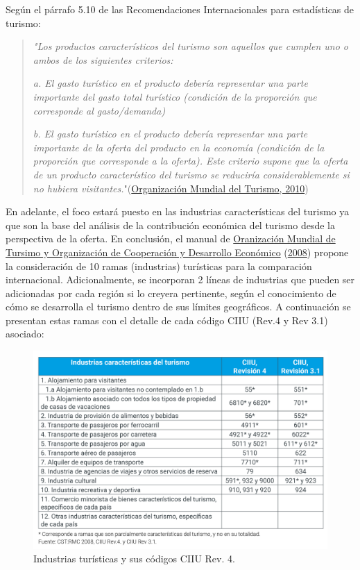 \documentclass[
  openany]{book}
\begin{document}
Según el párrafo 5.10 de las Recomendaciones Internacionales para estadísticas de turismo:

\begin{quote}
\emph{"Los productos característicos del turismo son aquellos que cumplen uno o ambos de los siguientes criterios:}

\emph{a. El gasto turístico en el producto debería representar una parte importante del gasto total turístico (condición de la proporción que corresponde al gasto/demanda)}

\emph{b. El gasto turístico en el producto debería representar una parte importante de la oferta del producto en la economía (condición de la proporción que corresponde a la oferta). Este criterio supone que la oferta de un producto característico del turismo se reduciría considerablemente si no hubiera visitantes.}"(\protect\hyperlink{ref-riet2008}{Organización Mundial del Turismo, 2010})
\end{quote}

En adelante, el foco estará puesto en las industrias características del turismo ya que son la base del análisis de la contribución económica del turismo desde la perspectiva de la oferta. En conclusión, el manual de \protect\hyperlink{ref-cstrmc2008}{Oranización Mundial de Tursimo y Organización de Cooperación y Desarrollo Económico} (\protect\hyperlink{ref-cstrmc2008}{2008}) propone la consideración de 10 ramas (industrias) turísticas para la comparación internacional. Adicionalmente, se incorporan 2 líneas de industrias que pueden ser adicionadas por cada región si lo creyera pertinente, según el conocimiento de cómo se desarrolla el turismo dentro de sus límites geográficos. A continuación se presentan estas ramas con el detalle de cada código CIIU (Rev.4 y Rev 3.1) asociado:

\begin{figure}

{\centering \includegraphics[width=1\linewidth]{imagenes/figura1.2} 

}

\caption{Industrias turísticas y sus códigos CIIU Rev. 4.}\label{fig:ciiu2}
\end{figure}
\end{document}
